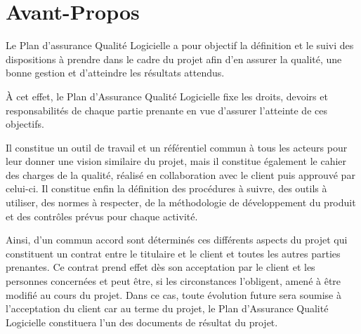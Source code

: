 \chapter*{Avant-Propos}

Le Plan d'assurance Qualité Logicielle a pour objectif la définition et le suivi des dispositions à prendre dans le cadre du projet \FactDev{} afin d’en
assurer la qualité, une bonne gestion et d’atteindre les résultats attendus.

À cet effet, le Plan d’Assurance Qualité Logicielle fixe les droits, devoirs et responsabilités de chaque partie prenante en vue d’assurer l'atteinte
de ces objectifs.

Il constitue un outil de travail et un référentiel commun à tous les acteurs pour leur donner une vision similaire du projet, mais il constitue
également le cahier des charges de la qualité, réalisé en collaboration avec le client puis approuvé par celui-ci. Il constitue enfin la définition
des procédures à suivre, des outils à utiliser, des normes à respecter, de la méthodologie de développement du produit et des contrôles prévus pour
chaque activité.

Ainsi, d’un commun accord sont déterminés ces différents aspects du projet qui constituent un contrat entre le titulaire et le client et toutes les
autres parties prenantes. Ce contrat prend effet dès son acceptation par le client et les personnes concernées et peut être, si les circonstances
l'obligent, amené à être modifié au cours du projet. Dans ce cas, toute évolution future sera soumise à l'acceptation du client car au terme du
projet, le Plan d’Assurance Qualité Logicielle constituera l’un des documents de résultat du projet.
